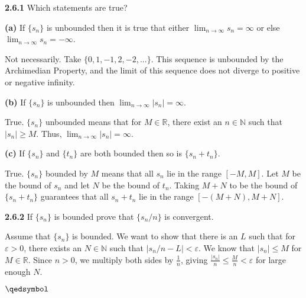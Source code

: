 \documentclass[12pt]{article}
\newcommand{\N}{\mathbb{N}}
\newcommand{\R}{\mathbb{R}}
\begin{document}
\begin{problem}\textbf{2.6.1}
Which statements are true?
\end{problem}
\begin{subproblem}\textbf{(a)}
If $\{s_n\}$ is unbounded then it is true that either $\lim_{n\to\infty}s_n=\infty$ or else $\lim_{n\to\infty}s_n=-\infty$.
\end{subproblem}
\begin{solution}
Not necessarily. Take $\{0,1,-1,2,-2,...\}$. This sequence is unbounded by the Archimedian Property, and the limit of this sequence does not diverge to positive or negative infinity.
\end{solution}
\begin{subproblem}\textbf{(b)}
If $\{s_n\}$ is unbounded then $\lim_{n\to\infty}|s_n|=\infty$.
\end{subproblem}
\begin{solution}
True. $\{s_n\}$ unbounded means that for $M\in\R$, there exist an $n\in\N$ such that $|s_n|\geq M$.\newline
Thus, $\lim_{n\to\infty}|s_n|=\infty$.
\end{solution}
\begin{subproblem}\textbf{(c)}
If $\{s_n\}$ and $\{t_n\}$ are both bounded then so is $\{s_n+t_n\}$.
\end{subproblem}
\begin{solution}
True. $\{s_n\}$ bounded by $M$ means that all $s_n$ lie in the range $[-M,M]$. Let $M$ be the bound of $s_n$ and let $N$ be the bound of $t_n$. Taking $M+N$ to be the bound of $\{s_n+t_n\}$ guarantees that all $s_n+t_n$ lie in the range $[-(M+N),M+N]$.
\end{solution}
\begin{problem}\textbf{2.6.2}
If $\{s_n\}$ is bounded prove that $\{s_n/n\}$ is convergent.
\end{problem}
\begin{solution}
Assume that $\{s_n\}$ is bounded.\newline
We want to show that there is an $L$ such that for $\varepsilon>0$, there exists an $N\in\N$ such that $|s_n/n-L|<\varepsilon$.\newline
We know that $|s_n|\leq M$ for $M\in\R$.\newline
Since $n>0$, we multiply both sides by $\frac{1}{n}$, giving $\frac{|s_n|}{n}\leq \frac{M}{n}<\varepsilon$ for large enough $N$.
\begin{flushright}
$\qedsymbol$
\end{flushright}
\end{solution}
\end{document}

